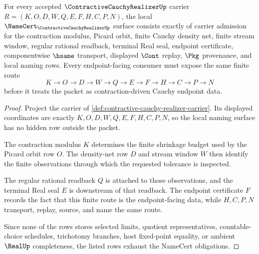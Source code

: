 \begin{theorem}
\label{thm:contractive-cauchy-realizer-namecert-obligations}
For every accepted $\ContractiveCauchyRealizerUp$ carrier $R=(K,O,D,W,Q,E,F,H,C,P,N)$, the local $\NameCert_{\ContractiveCauchyRealizerUp}$ surface consists exactly of carrier admission for the contraction modulus, Picard orbit, finite Cauchy density net, finite stream window, regular rational readback, terminal Real seal, endpoint certificate, componentwise $\hsame$ transport, displayed $\Cont$ replay, $\Pkg$ provenance, and local naming rows. Every endpoint-facing consumer must expose the same finite route
$$
K \to O \to D \to W \to Q \to E \to F \to H \to C \to P \to N
$$
before it treats the packet as contraction-driven Cauchy endpoint data.
\end{theorem}
\begin{proof}
Project the carrier of \autoref{def:contractive-cauchy-realizer-carrier}. Its displayed coordinates are exactly $K,O,D,W,Q,E,F,H,C,P,N$, so the local naming surface has no hidden row outside the packet.

The contraction modulus $K$ determines the finite shrinkage budget used by the Picard orbit row $O$. The density-net row $D$ and stream window $W$ then identify the finite observations through which the requested tolerance is inspected.

The regular rational readback $Q$ is attached to those observations, and the terminal Real seal $E$ is downstream of that readback. The endpoint certificate $F$ records the fact that this finite route is the endpoint-facing data, while $H,C,P,N$ transport, replay, source, and name the same route.

Since none of the rows stores selected limits, quotient representatives, countable-choice schedules, trichotomy branches, host fixed-point equality, or ambient $\RealUp$ completeness, the listed rows exhaust the NameCert obligations.
\end{proof}

